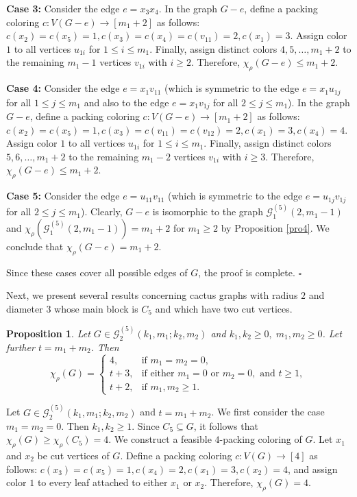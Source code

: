 \documentclass[12pt]{article}
\newtheorem{proposition}[theorem]{Proposition}
\newcommand{\proof}{\noindent{\bf Proof.\ }}
\newcommand{\qed}{\hfill $\square$ \bigskip}
\begin{document}
\textbf{Case 3:} Consider the edge $e=x_3x_4$. In the graph \( G-e \), define a packing coloring \( c : V(G-e) \to [m_1+2] \) as follows:
$c(x_2)=c(x_5)= 1, 
c(x_3)=c(x_4)=c(v_{11})= 2,
c(x_1) = 3.$
Assign color \(1\) to all vertices \(u_{1i}\) for \(1 \le i \le m_1\). 
Finally, assign distinct colors \(4, 5, \dots, m_1+2\) to the remaining \(m_1-1\) vertices \(v_{1i}\) with \(i \ge 2\). 
Therefore, \(\chi_\rho(G-e) \le m_1+2\).
	
\textbf{Case 4:} Consider the edge $e=x_1v_{11}$ 
(which is symmetric to the edge $e = x_1u_{1j}$ for all $1 \leq j \leq m_1$ and also to the edge $e = x_1v_{1j}$ for all $2 \leq j \leq m_1$). In the graph \( G-e \), define a packing coloring \( c : V(G-e) \to [m_1+2] \) as follows:
$c(x_2)=c(x_5)= 1, 
c(x_3)=c(v_{11})=c(v_{12})= 2,
c(x_1)=3,
c(x_4)=4.$
Assign color \(1\) to all vertices \(u_{1i}\) for \(1 \le i \le m_1\). 
Finally, assign distinct colors \(5, 6, \dots, m_1+2\) to the remaining \(m_1-2\) vertices \(v_{1i}\) with \(i \ge 3\). 
Therefore, \(\chi_\rho(G-e) \le m_1+2\).
	
\textbf{Case 5:} Consider the edge $e=u_{11}v_{11}$ (which is symmetric to the edge $e = u_{1j}v_{1j}$ for all $2 \leq j \leq m_1$).  Clearly, $G-e$ is isomorphic to the graph $\mathcal{G}_{1}^{(5)}(2,m_1-1)$ and $\chi_{\rho}(\mathcal{G}_{1}^{(5)}(2,m_1-1)) = m_1+2$ for $m_1\geq2$ by Proposition \ref{pro4}. We conclude that  $\chi_\rho(G-e) =  m_1+2$.
	
Since these cases cover all possible edges of $G$, the proof is complete.
\qed

Next, we present several results concerning cactus graphs with radius $2$ and diameter $3$ whose main block is $C_5$ and which have two cut vertices.

\begin{proposition}\label{pro8}
Let $G \in \mathcal{G}_{2}^{(5)}(k_{1},m_{1};k_{2},m_{2})$ and $k_1, k_2 \geq 0, \; m_1, m_2 \geq 0$. Let further $t = m_1+m_2$. Then
\[
\chi_\rho(G) =
\begin{cases}
4, & \text{if } m_1=m_2= 0, \\[6pt]
t+3, & \text{if either } m_1 = 0 \text{ or } m_2 = 0, \text{ and } t \geq 1, \\[6pt]
t+2, & \text{if }  m_1, m_2 \geq 1.
\end{cases}
\]
\end{proposition}

\proof Let $G \in \mathcal{G}_{2}^{(5)}(k_{1},m_{1};k_{2},m_{2})$ and $t = m_1+m_2$. We first consider the case $m_1=m_2 = 0$. Then $k_1, k_2 \geq 1$. Since $C_5 \subseteq G$, it follows that  $\chi_\rho(G) \geq \chi_\rho(C_5) = 4$. We construct a feasible $4$-packing coloring of $G$.  Let $x_1$ and $x_2$ be cut vertices of $G$. Define a packing coloring $c:V(G)\to[4]$ as follows: $c(x_3)=c(x_5)=1, c(x_4)=2, c(x_1)=3, c(x_2)=4$, and assign color $1$ to every leaf attached to either $x_1$ or $x_2$.
Therefore,  $\chi_\rho(G) =  4$.
	
\end{document}
